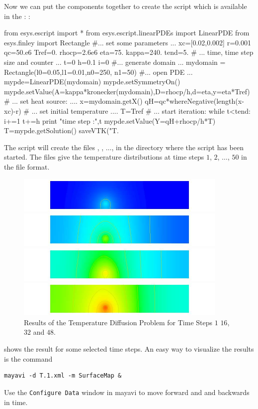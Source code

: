 Now we can put the components together to create the script  which is available in the \ExampleDirectory:
:
\begin{python}
from esys.escript import *
from esys.escript.linearPDEs import LinearPDE
from esys.finley import Rectangle
#... set some parameters ...
xc=[0.02,0.002]
r=0.001
qc=50.e6
Tref=0.
rhocp=2.6e6
eta=75.
kappa=240.
tend=5.
# ... time, time step size and counter ...
t=0
h=0.1
i=0
#... generate domain ...
mydomain = Rectangle(l0=0.05,l1=0.01,n0=250, n1=50)
#... open PDE ...
mypde=LinearPDE(mydomain)
mypde.setSymmetryOn()
mypde.setValue(A=kappa*kronecker(mydomain),D=rhocp/h,d=eta,y=eta*Tref)
# ... set heat source: ....
x=mydomain.getX()
qH=qc*whereNegative(length(x-xc)-r)
# ... set initial temperature ....
T=Tref
# ... start iteration:
while t<tend:
      i+=1
      t+=h
      print "time step :",t
      mypde.setValue(Y=qH+rhocp/h*T)
      T=mypde.getSolution()
      saveVTK("T.%
\end{python}
The script will create the files ,
 , $\ldots$,  in the directory where the script has been started. The files give the 
temperature distributions at time steps $1$, $2$, $\ldots$, $50$ in the \VTK file format. 

\begin{figure}
\centerline{\includegraphics[width=\figwidth]{figures/DiffusionRes1}}
\centerline{\includegraphics[width=\figwidth]{figures/DiffusionRes16}}
\centerline{\includegraphics[width=\figwidth]{figures/DiffusionRes32}}
\centerline{\includegraphics[width=\figwidth]{figures/DiffusionRes48}}
\caption{Results of the Temperature Diffusion Problem for Time Steps $1$ $16$, $32$ and $48$.}
\label{DIFFUSION FIG 2}
\end{figure}
 shows the result for some selected time steps.
An easy way to visualize the results is the command
\begin{verbatim}
mayavi -d T.1.xml -m SurfaceMap &
\end{verbatim}
Use the \texttt{Configure Data} window in mayavi
to move forward and and backwards in time. 
